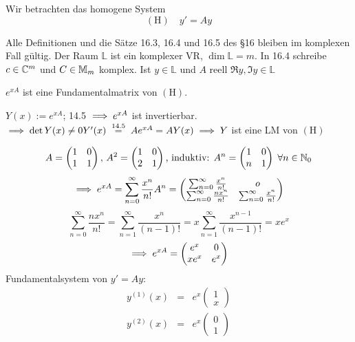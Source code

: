 \documentclass{article}
\begin{document}
Wir betrachten das homogene System
\[(\text{H}) \quad y' = Ay\]

\begin{folgerung}
Alle Definitionen und die Sätze 16.3, 16.4 und 16.5 des §16 bleiben im komplexen Fall gültig. Der Raum $\mathbb{L}$ ist ein komplexer VR, $\dim \mathbb{L} = m$. In 16.4 schreibe $c \in \mathbb{C}^m$ und $C \in \mathbb{M}_m$ komplex. Ist $y \in \mathbb{L}$ und $A$ reell  $\Re y, \Im y \in \mathbb{L}$ 
\end{folgerung}

\begin{satz}
$e^{xA}$ ist eine Fundamentalmatrix von $(\text{H})$.
\end{satz}

\begin{beweis}
$Y(x):=e^{xA}$; 14.5 $\implies e^{xA}$ ist invertierbar. $\folgt \det Y(x) \neq 0 \\
Y'(x) \gleichnach{14.5} Ae^{xA} = AY(x) \folgt Y$ ist eine LM von $(\text{H})$
\end{beweis}

\begin{beispiel}[m=2]
\[ A=\begin{pmatrix}1 & 0 \\ 1 & 1 \end{pmatrix},\, A^2 = \begin{pmatrix} 1 & 0 \\ 2 & 1 \end{pmatrix} \text{, 
induktiv: } A^n = \begin{pmatrix} 1 & 0 \\ n & 1 \end{pmatrix} \; \forall n \in \mathbb{N}_0 \]
\[ \implies e^{xA} = \sum_{n=0}^{\infty} \frac{x^n}{n!}A^n = \begin{pmatrix} \sum_{n=0}^{\infty} \frac{x^n}{n!} & o \\
\sum_{n=0}^{\infty} \frac{nx^n}{n!} & \sum_{n=0}^{\infty} \frac{x^n}{n!} \end{pmatrix} \]
\[\sum_{n=0}^{\infty} \frac{nx^n}{n!} = \sum_{n=1}^{\infty} \frac{x^n}{(n-1)!} = x\sum_{n=1}^{\infty} \frac{x^{n-1}}{(n-1)!} = xe^x \]
\[ \implies e^{xA} = \begin{pmatrix} e^x & 0 \\ xe^x & e^x \end{pmatrix}\]
Fundamentalsystem von $y' = Ay:$  \begin{eqnarray*} y^{(1)}(x) &=& e^x\begin{pmatrix}1\\x \end{pmatrix} \\ y^{(2)}(x) &=& e^x\begin{pmatrix}0\\1\end{pmatrix}\end{eqnarray*} 
\end{beispiel}
\end{document}
